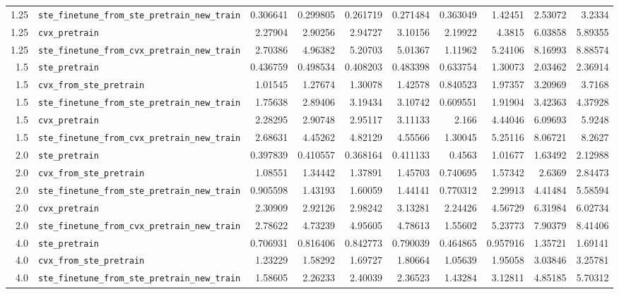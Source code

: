 \begin{longtable}{@{}r l *{8}{r}@{}}
1.25 & \texttt{ste\_finetune\_from\_ste\_pretrain\_new\_train} & 0.306641 & 0.299805 & 0.261719 & 0.271484 & 0.363049 & 1.42451 & 2.53072 & 3.2334 \\
1.25 & \texttt{cvx\_pretrain} & 2.27904 & 2.90256 & 2.94727 & 3.10156 & 2.19922 & 4.3815 & 6.03858 & 5.89355 \\
1.25 & \texttt{ste\_finetune\_from\_cvx\_pretrain\_new\_train} & 2.70386 & 4.96382 & 5.20703 & 5.01367 & 1.11962 & 5.24106 & 8.16993 & 8.88574 \\
1.5 & \texttt{ste\_pretrain} & 0.436759 & 0.498534 & 0.408203 & 0.483398 & 0.633754 & 1.30073 & 2.03462 & 2.36914 \\
1.5 & \texttt{cvx\_from\_ste\_pretrain} & 1.01545 & 1.27674 & 1.30078 & 1.42578 & 0.840523 & 1.97357 & 3.20969 & 3.7168 \\
1.5 & \texttt{ste\_finetune\_from\_ste\_pretrain\_new\_train} & 1.75638 & 2.89406 & 3.19434 & 3.10742 & 0.609551 & 1.91904 & 3.42363 & 4.37928 \\
1.5 & \texttt{cvx\_pretrain} & 2.28295 & 2.90748 & 2.95117 & 3.11133 & 2.166 & 4.44046 & 6.09693 & 5.9248 \\
1.5 & \texttt{ste\_finetune\_from\_cvx\_pretrain\_new\_train} & 2.68631 & 4.45262 & 4.82129 & 4.55566 & 1.30045 & 5.25116 & 8.06721 & 8.2627 \\
2.0 & \texttt{ste\_pretrain} & 0.397839 & 0.410557 & 0.368164 & 0.411133 & 0.4563 & 1.01677 & 1.63492 & 2.12988 \\
2.0 & \texttt{cvx\_from\_ste\_pretrain} & 1.08551 & 1.34442 & 1.37891 & 1.45703 & 0.740695 & 1.57342 & 2.6369 & 2.84473 \\
2.0 & \texttt{ste\_finetune\_from\_ste\_pretrain\_new\_train} & 0.905598 & 1.43193 & 1.60059 & 1.44141 & 0.770312 & 2.29913 & 4.41484 & 5.58594 \\
2.0 & \texttt{cvx\_pretrain} & 2.30909 & 2.92126 & 2.98242 & 3.13281 & 2.24426 & 4.56729 & 6.31984 & 6.02734 \\
2.0 & \texttt{ste\_finetune\_from\_cvx\_pretrain\_new\_train} & 2.78622 & 4.73239 & 4.95605 & 4.78613 & 1.55602 & 5.23773 & 7.90379 & 8.41406 \\
4.0 & \texttt{ste\_pretrain} & 0.706931 & 0.816406 & 0.842773 & 0.790039 & 0.464865 & 0.957916 & 1.35721 & 1.69141 \\
4.0 & \texttt{cvx\_from\_ste\_pretrain} & 1.23229 & 1.58292 & 1.69727 & 1.80664 & 1.05639 & 1.95058 & 3.03846 & 3.25781 \\
4.0 & \texttt{ste\_finetune\_from\_ste\_pretrain\_new\_train} & 1.58605 & 2.26233 & 2.40039 & 2.36523 & 1.43284 & 3.12811 & 4.85185 & 5.70312 \\

\end{longtable}

